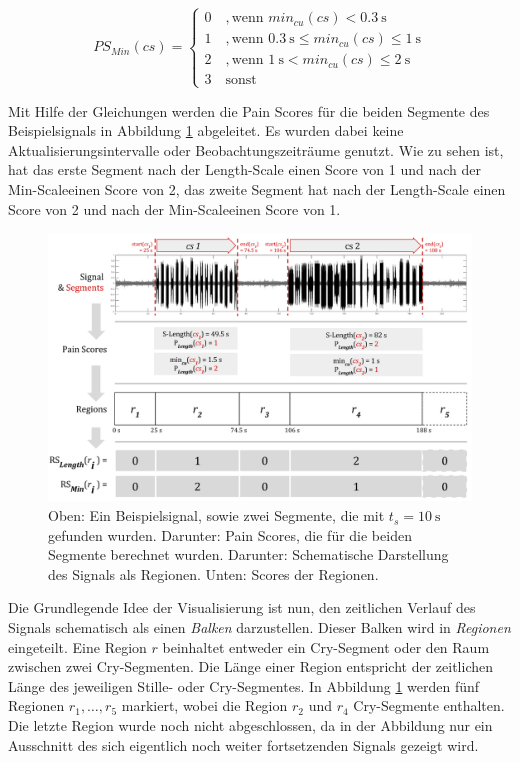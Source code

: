 \begin{equation}
PS_{Min}(cs) = \begin{cases}
 0 \quad ,  \text{wenn } min_{cu}(cs) < \SI{0.3}{\second}\\
 1 \quad ,  \text{wenn } \SI{0.3}{\second} \leq min_{cu}(cs) \leq \SI{1}{\second}\\
 2 \quad ,  \text{wenn } \SI{1}{\second} < min_{cu}(cs) \leq \SI{2}{\second} \\
 3 \quad  \text{sonst }
 \end{cases}	
 \label{eq:ps_length}
\end{equation}

Mit Hilfe der Gleichungen werden die Pain Scores für die beiden Segmente des Beispielsignals in Abbildung \ref{img:visualisation_example_01} abgeleitet. Es wurden dabei keine Aktualisierungsintervalle oder Beobachtungszeiträume genutzt. Wie zu sehen ist, hat das erste Segment nach der \glqq Length-Scale\grqq{} einen Score von 1 und nach der \glqq Min-Scale\grqq einen Score von 2, das zweite Segment hat nach der \glqq Length-Scale\grqq{} einen Score von 2 und nach der \glqq Min-Scale\grqq einen Score von 1.

\begin{figure}[h]
	\centering
	\includegraphics[width=1\textwidth]{bilder/visualisation_example_01.png}
	\caption{Oben: Ein Beispielsignal, sowie zwei Segmente, die mit $t_s = \SI{10}{\second}$ gefunden wurden. Darunter: Pain Scores, die für die beiden Segmente berechnet wurden. Darunter: Schematische Darstellung des Signals als Regionen. Unten: Scores der Regionen.}
	\label{img:visualisation_example_01}
\end{figure}

Die Grundlegende Idee der Visualisierung ist nun, den zeitlichen Verlauf des Signals schematisch als einen \emph{Balken} darzustellen. Dieser Balken wird in \emph{Regionen} eingeteilt. Eine Region $r$ beinhaltet entweder ein Cry-Segment oder den Raum zwischen zwei Cry-Segmenten. Die Länge einer Region entspricht der zeitlichen Länge des jeweiligen Stille- oder Cry-Segmentes. In Abbildung \ref{img:visualisation_example_01} werden fünf Regionen $r_{1} , \ldots , r_5 $ markiert, wobei die Region $r_2$ und $r_4$ Cry-Segmente enthalten. Die letzte Region wurde noch nicht abgeschlossen, da in der Abbildung nur ein Ausschnitt des sich eigentlich noch weiter fortsetzenden Signals gezeigt wird.

